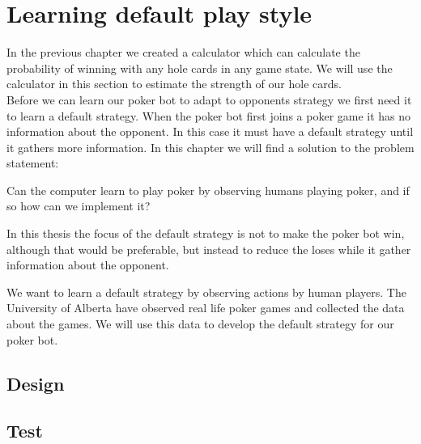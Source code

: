 \section{Learning default play style}
\label{sec:part2}
In the previous chapter we created a calculator which can calculate the probability of winning with any hole cards in any game state. We will use the calculator in this section to estimate the strength of our hole cards.\\

Before we can learn our poker bot to adapt to opponents strategy we first need it to learn a default strategy. When the poker bot first joins a poker game it has no information about the opponent. In this case it must have a default strategy until it gathers more information.
In this chapter we will find a solution to the problem statement:

\vspace{4mm}
\begin{statementBox}
Can the computer learn to play poker by observing humans playing poker, and if so how can we implement it?
\end{statementBox}
\vspace{4mm}

In this thesis the focus of the default strategy is not to make the poker bot win, although that would be preferable, but instead to reduce the loses while it gather information about the opponent.

We want to learn a default strategy by observing actions by human players. The University of Alberta have observed  real life poker games and collected the data about the games. We will use this data to develop the default strategy for our poker bot.

\subsection{Design}


\subsection{Test}
